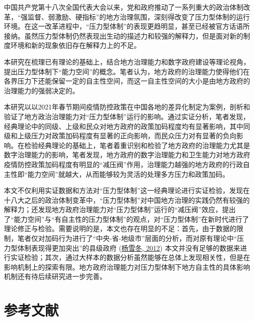 \documentclass[
  12pt,
]{ctexart}
\begin{document}
中国共产党第十八次全国代表大会以来，党和政府推动了一系列重大的政治体制改革，``强监督、弱激励、硬指标''的地方治理氛围，深刻得改变了压力型体制的运行环境。在这一改革进程中，``压力型体制''的表现更趋明显，甚至已经被官方话语所接纳。虽然压力型体制仍然表现出生动的描述力和较强的解释力，但是面对新的制度环境和新的现象依旧存在解释力上的不足。

本研究在梳理已有理论的基础上，结合地方治理能力和数字政府建设等理论视角，提出压力型体制下``能力空间''的概念。笔者认为，地方政府的治理能力使得他们在各界压力下还能保留一定的自主性空间，而这一自主性空间的大小是由地方政府的治理能力的强弱决定的。

本研究以以2021年春节期间疫情防控政策在中国各地的差异化制定为案例，剖析和验证了地方政治治理能力对``压力型体制''运行的影响。通过实证分析，笔者发现，经典理论中的同级、上级和民众对地方政府的政策加码程度均有显著影响，其中同级和上级压力对政策加码程度有显著的正向影响，而民众压力对有显著的负向影响。在检验经典理论的基础上，笔者着重识别和检验了地方政府的治理能力尤其是数字治理能力的影响，笔者发现，地方政府的数字治理能力和卫生能力对地方政府疫情防控政策加码程度有明显的``减压阀''作用，治理能力越强的地方政府的行政自主性即``能力空间''就越大，从而能够较为灵活的处理多方压力和政策加码。

本文不仅利用实证数据和方法对``压力型体制''这一经典理论进行实证检验，发现在十八大之后的政治体制变革中，``压力型体制''对中国地方治理的实践仍然有较强的解释力；还发现地方政府治理能力对``压力型体制''运行的``减压阀''效应，提出了``能力空间''与``有自主性的压力型体制''的观点，对``压力型体制''在新时代进行了理论修正与检验。需要说明的是，本文也存在明显的不足：首先，由于数据的限制，笔者仅对加码行为进行了``中央-省-地级市''层面的分析，而对原有理论中``压力型体制表现得更加突出''的县级政府 (\protect\hyperlink{ref-YangXueDong2012}{杨雪冬, 2012}) 本文并没有足够的数据来进行实证检验；其次，通过大样本的数据分析虽然能够在总体上发现相关性，但是在影响机制上的探索有限。地方政府治理能力对压力型体制下地方自主性的具体影响机制还有待后续研究进一步完善。

\newpage

\hypertarget{ux53c2ux8003ux6587ux732e}{%
\section*{参考文献}\label{ux53c2ux8003ux6587ux732e}}
\end{document}
